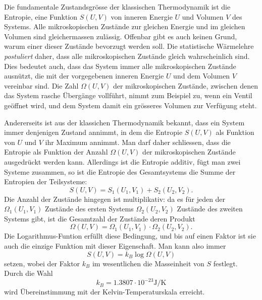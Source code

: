Die fundamentale Zustandsgrösse der klassischen Thermodynamik ist
die Entropie, eine Funktion $S(U,V)$ von inneren Energie $U$ und 
Volumen $V$ des Systems. 
Alle mikroskopischen Zustände zur gleichen Energie und im gleichen
Volumen sind gleichermassen zulässig.
Offenbar gibt es auch keinen Grund, warum einer dieser Zustände
bevorzugt werden soll.
Die statistische Wärmelehre
{\em postuliert} daher, dass alle mikroskopischen Zustände gleich
wahrscheinlich sind.
Dies bedeutet auch, dass das System immer alle mikroskopischen
Zustände ausnützt, die mit der vorgegebenen inneren Energie $U$ und
dem Volumen $V$ vereinbar sind.
Die Zahl $\Omega(U,V)$ der mikroskopischen Zustände, zwischen denen das
System rasche Übergänge vollführt, nimmt zum Beispiel zu, wenn ein
Ventil geöffnet wird, und dem System damit ein grösseres Volumen
zur Verfügung steht.

Andererseits ist aus der klassichen Thermodynamik bekannt, dass ein
System immer denjenigen Zustand annimmt, in dem die Entropie $S(U,V)$
als Funktion von $U$ und $V$ ihr Maximum annimmt.
Man darf daher schliessen, dass die Entropie als Funktion der Anzahl
$\Omega(U,V)$ der mikroskopischen Zustände ausgedrückt werden kann.
Allerdings ist die Entropie additiv, fügt man zwei Systeme zusammen,
so ist die Entropie des Gesamtsystems die Summe der Entropien der
Teilsysteme:
\[
S(U,V) = S_1(U_1,V_1) + S_2(U_2,V_2).
\]
Die Anzahl der Zustände hingegen ist multiplikativ: da es für jeden
der $\Omega_1(U_1,V_1)$ Zustände des ersten Systems $\Omega_2(U_2,V_2)$
Zustände des zweiten Systems gibt, ist die Gesamtzahl der Zustände
deren Produkt
\[
\Omega(U,V)=\Omega_1(U_1,V_1)\cdot \Omega_2(U_2,V_2).
\]
Die Logarithmus-Funtion erfüllt diese Bedingung, und bis auf einen
Faktor ist sie auch die einzige Funktion mit dieser Eigenschaft.
Man kann also immer
\begin{equation}
S(U,V)=k_B\log \Omega(U,V)
\label{skript:cmb:boltzmann}
\end{equation}
setzen, wobei der Faktor $k_B$ im wesentlichen die Masseinheit von
$S$ festlegt.
Durch die Wahl
\[
k_B = 1.3807\cdot 10^{-23} \text{J}/\text{K}
\]
wird Übereinstimmung mit der Kelvin-Temperaturskala erreicht.

